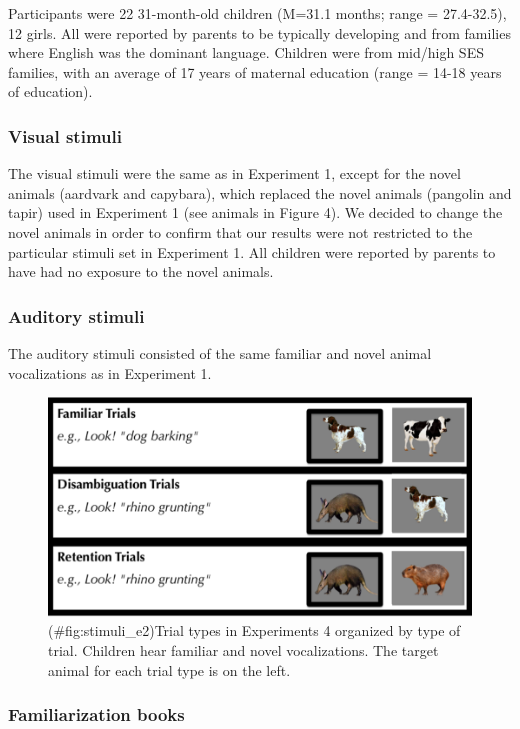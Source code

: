 \documentclass[english,floatsintext,man]{apa6}
\theoremstyle{definition}
\theoremstyle{definition}
\theoremstyle{definition}
\theoremstyle{remark}
\begin{document}
Participants were 22 31-month-old children (M=31.1 months; range =
27.4-32.5), 12 girls. All were reported by parents to be typically
developing and from families where English was the dominant language.
Children were from mid/high SES families, with an average of 17 years of
maternal education (range = 14-18 years of education).

\subsubsection{Visual stimuli}\label{visual-stimuli-1}

The visual stimuli were the same as in Experiment 1, except for the
novel animals (aardvark and capybara), which replaced the novel animals
(pangolin and tapir) used in Experiment 1 (see animals in Figure 4). We
decided to change the novel animals in order to confirm that our results
were not restricted to the particular stimuli set in Experiment 1. All
children were reported by parents to have had no exposure to the novel
animals.

\subsubsection{Auditory stimuli}\label{auditory-stimuli-1}

The auditory stimuli consisted of the same familiar and novel animal
vocalizations as in Experiment 1.

\begin{figure}
\centering
\includegraphics{anime_manuscript_files/figure-latex/stimuli_e2-1.pdf}
\caption{(\#fig:stimuli\_e2)Trial types in Experiments 4 organized by
type of trial. Children hear familiar and novel vocalizations. The
target animal for each trial type is on the left.}
\end{figure}

\subsubsection{Familiarization books}\label{familiarization-books-1}
\end{document}
